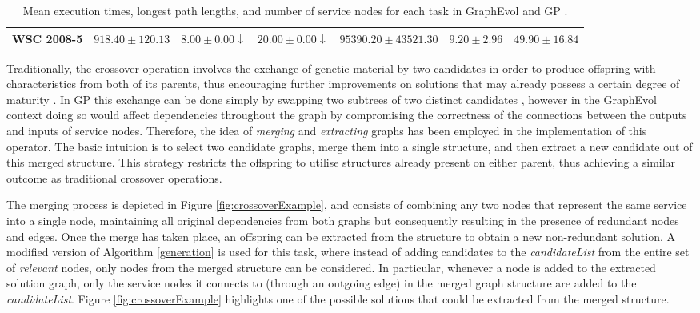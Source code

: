 \documentclass{article}
\begin{document}
\begin{table}[t]
{\begin{tabular}{c|c|c|c|c|c|c|}
\multicolumn{1}{|c|}{WSC 2008-5}    & $918.40 \pm 120.13$     & $8.00 \pm 0.00\downarrow$       & $20.00 \pm 0.00\downarrow$                                   & $95390.20 \pm 43521.30$                      & $9.20 \pm 2.96$       & $49.90 \pm 16.84$             \\ \hline
\end{tabular}}
\caption{Mean execution times, longest path lengths, and number of service nodes for each task in GraphEvol and GP \protect\cite{rodriguez2010composition}.}
\label{resultsTable}
\vspace{-0.2cm}
\end{table}

Traditionally, the crossover operation involves the exchange of genetic material by two candidates in order to produce
offspring with characteristics from both of its parents, thus encouraging further improvements on solutions that may already
possess a certain degree of maturity \cite{qi1994theoretical}. In GP this exchange can be done simply by swapping two subtrees
of two distinct candidates \cite{aversano2006genetic}, however in the GraphEvol context doing so would affect dependencies
throughout the graph by compromising the correctness of the connections between the outputs and inputs of service nodes. Therefore,
the idea of \textit{merging} and \textit{extracting} graphs has been employed in the implementation of this operator.
The basic intuition is to select two candidate graphs, merge them into a single structure, and then extract a new candidate out
of this merged structure. This strategy restricts the offspring to utilise structures already present on either parent, thus achieving
a similar outcome as traditional crossover operations.

The merging process is depicted in Figure \ref{fig:crossoverExample},
and consists of combining any two nodes that represent the same service into a single node, maintaining all original dependencies from both
graphs but consequently resulting in the presence of redundant nodes and edges. Once the merge has
taken place, an offspring can be extracted from the structure to obtain a new non-redundant solution. A modified version of Algorithm
\ref{generation} is used for this task, where instead of adding candidates to the \textit{candidateList} from the entire set of
\textit{relevant} nodes, only nodes from the merged structure can be considered. In particular, whenever a node is added to the extracted
solution graph, only the service nodes it connects to (through an outgoing edge) in the merged graph structure are added to the
\textit{candidateList}. Figure \ref{fig:crossoverExample} highlights one of the possible solutions that
could be extracted from the merged structure.
\end{document}
